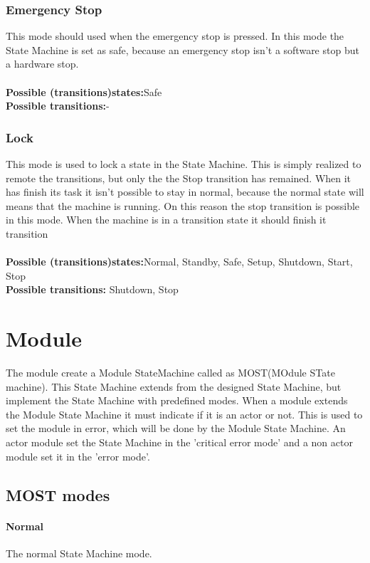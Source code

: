 \documentclass[12pt,a4paper]{report}
\begin{document}
\subsubsection{Emergency Stop}This mode should used when the emergency stop is pressed. In this mode the State Machine is set as safe, because an emergency stop isn't a software stop but a hardware stop.\\\\
\textbf{Possible (transitions)states:}Safe\\
\textbf{Possible transitions:}-

\subsubsection{Lock}This mode is used to lock a state in the State Machine. This is simply realized to remote the transitions, but only the the Stop transition has remained. When it has finish its task it isn't possible to stay in normal, because the normal state will means that the machine is running. On this reason the stop transition is possible in this mode. When the machine is in a transition state it should finish it transition\\\\
\textbf{Possible (transitions)states:}Normal, Standby, Safe, Setup, Shutdown, Start, Stop\\
\textbf{Possible transitions:} Shutdown, Stop

\section{Module}
The module create a Module StateMachine called as MOST(MOdule STate machine). This State Machine extends from the designed State Machine, but implement the State Machine with predefined modes. When a module extends the Module State Machine it must indicate if it is an actor or not. This is used to set the module in error, which will be done by the Module State Machine. An actor module set the State Machine in the 'critical error mode' and a non actor module set it in the 'error mode'. 

\subsection{MOST modes}
\paragraph{Normal}The normal State Machine mode.
\end{document}
